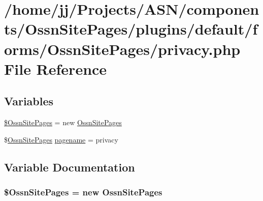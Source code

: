 \hypertarget{components_2_ossn_site_pages_2plugins_2default_2forms_2_ossn_site_pages_2privacy_8php}{}\section{/home/jj/\+Projects/\+A\+S\+N/components/\+Ossn\+Site\+Pages/plugins/default/forms/\+Ossn\+Site\+Pages/privacy.php File Reference}
\label{components_2_ossn_site_pages_2plugins_2default_2forms_2_ossn_site_pages_2privacy_8php}
\subsection*{Variables}
\begin{DoxyCompactItemize}
\item 
\hyperlink{components_2_ossn_site_pages_2plugins_2default_2forms_2_ossn_site_pages_2privacy_8php_ae6d62adf54fdace37cf84f4a754bcc3b}{\$\+Ossn\+Site\+Pages} = new \hyperlink{class_ossn_site_pages}{Ossn\+Site\+Pages}
\item 
\$\hyperlink{class_ossn_site_pages}{Ossn\+Site\+Pages} \hyperlink{components_2_ossn_site_pages_2plugins_2default_2forms_2_ossn_site_pages_2privacy_8php_a790771bf91bb6454bf0c60185eb09c9f}{pagename} = \textquotesingle{}privacy\textquotesingle{}
\end{DoxyCompactItemize}


\subsection{Variable Documentation}
\subsubsection[{\texorpdfstring{\$\+Ossn\+Site\+Pages}{$OssnSitePages}}]{\setlength{\rightskip}{0pt plus 5cm}\${\bf Ossn\+Site\+Pages} = new {\bf Ossn\+Site\+Pages}}\hypertarget{components_2_ossn_site_pages_2plugins_2default_2forms_2_ossn_site_pages_2privacy_8php_ae6d62adf54fdace37cf84f4a754bcc3b}{}\label{components_2_ossn_site_pages_2plugins_2default_2forms_2_ossn_site_pages_2privacy_8php_ae6d62adf54fdace37cf84f4a754bcc3b}


